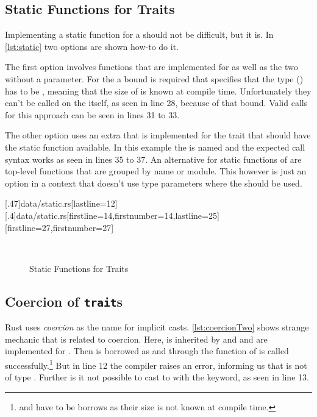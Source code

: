 \documentclass[thesis]{subfiles}
\begin{document}
  \subsection{Static Functions for Traits}
    Implementing a static function for a \trait should not be difficult, but it is.
    In \autoref{lst:static} two options are shown how-to do it.

    The first option involves functions that are implemented for \Foo as well as the two \traits without a \self parameter.
    For the \traits a bound is required that specifies that the \self type (\Self) has to be \Sized, meaning that the size of \Self is known at compile time.
    Unfortunately they can't be called on the \trait itself, as seen in line 28, because of that bound.
    Valid calls for this approach can be seen in lines 31 to 33.

    The other option uses an extra \trait that is implemented for the trait that should have the static function available.
    In this example the \trait is named  and the expected call syntax works as seen in lines 35 to 37.
    An alternative for static functions of \traits are top-level functions that are grouped by name or module.
    This however is just an option in a context that doesn't use type parameters where the \trait should be used.

    \LstTikzBox{\staticOne}[.47\linewidth]{data/static.rs}[lastline=12]
    \LstTikzBox{\staticTwo}[.4\linewidth]{data/static.rs}[firstline=14,firstnumber=14,lastline=25]
    [firstline=27,firstnumber=27]
    \begin{figure}[ht]
      \captionsetup{type=lstlisting}
      \centering
      \usebox{\staticOne}\hfill%
      \usebox{\staticTwo}\\\vspace*{.75em}%
      \usebox{\staticThree}
      \caption{Static Functions for Traits}\label{lst:static}
    \end{figure}

  \subsection{Coercion of \texttt{trait}s}
    Rust uses \emph{coercion} as the name for implicit casts.
    \autoref{lst:coercionTwo} shows strange mechanic that is related to coercion.
    Here, \A is inherited by \B and \B and \A are implemented for \Foo.
    Then  is borrowed as  and through  the function \fun of \A is called successfully.\footnote{
       and  have to be borrows as their size is not known at compile time.\autocite[E0277 referes to 19.4 Advanced Types]{rust-doc}
    }
    But in line 12 the compiler raises an error, informing us that  is not of type \A.
    Further is it not possible to cast  to  with the  keyword, as seen in line 13.
\end{document}

